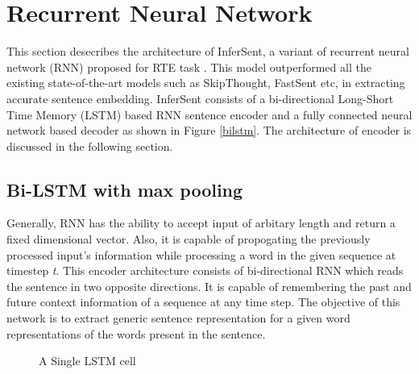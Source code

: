 \documentclass[12pt]{report} %
\begin{document}
	 \section{Recurrent Neural Network}
	 This section desecribes the architecture of InferSent, a variant of recurrent neural network (RNN) proposed for RTE task \citep{conneau2017supervised}. This model outperformed all the existing state-of-the-art models such as SkipThought, FastSent etc, in extracting accurate sentence embedding. InferSent consists of a bi-directional Long-Short Time Memory (LSTM) based RNN sentence encoder and a fully connected neural network based decoder as shown in Figure \ref{bilstm}. The architecture of encoder is discussed in the following section. 
	 
	\subsection{Bi-LSTM with max pooling}
	Generally, RNN has the ability to accept input of arbitary length and return a fixed dimensional vector. Also, it is capable of propogating the previously processed input's information while processing a word in the given sequence at timestep \textit{t}.
	This encoder architecture consists of bi-directional RNN which reads the sentence in two opposite directions. It is capable of remembering the past and future context information of a sequence at any time step. The objective of this network is to extract generic sentence representation for a given word representations of the words present in the sentence.  
	
	
	\begin{figure}[!tbp]
		\centering
		\caption{A Single LSTM cell \citep{SeqMod2018Andrew}}
		\label{lstm}
	\end{figure}
	
\end{document}
